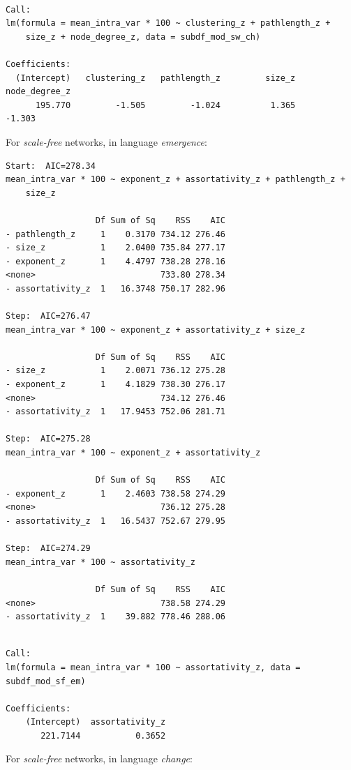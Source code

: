 \documentclass[
]{article}
\begin{document}
\begin{verbatim}

Call:
lm(formula = mean_intra_var * 100 ~ clustering_z + pathlength_z + 
    size_z + node_degree_z, data = subdf_mod_sw_ch)

Coefficients:
  (Intercept)   clustering_z   pathlength_z         size_z  node_degree_z  
      195.770         -1.505         -1.024          1.365         -1.303  
\end{verbatim}

For \emph{scale-free} networks, in language \emph{emergence}:

\begin{verbatim}
Start:  AIC=278.34
mean_intra_var * 100 ~ exponent_z + assortativity_z + pathlength_z + 
    size_z

                  Df Sum of Sq    RSS    AIC
- pathlength_z     1    0.3170 734.12 276.46
- size_z           1    2.0400 735.84 277.17
- exponent_z       1    4.4797 738.28 278.16
<none>                         733.80 278.34
- assortativity_z  1   16.3748 750.17 282.96

Step:  AIC=276.47
mean_intra_var * 100 ~ exponent_z + assortativity_z + size_z

                  Df Sum of Sq    RSS    AIC
- size_z           1    2.0071 736.12 275.28
- exponent_z       1    4.1829 738.30 276.17
<none>                         734.12 276.46
- assortativity_z  1   17.9453 752.06 281.71

Step:  AIC=275.28
mean_intra_var * 100 ~ exponent_z + assortativity_z

                  Df Sum of Sq    RSS    AIC
- exponent_z       1    2.4603 738.58 274.29
<none>                         736.12 275.28
- assortativity_z  1   16.5437 752.67 279.95

Step:  AIC=274.29
mean_intra_var * 100 ~ assortativity_z

                  Df Sum of Sq    RSS    AIC
<none>                         738.58 274.29
- assortativity_z  1    39.882 778.46 288.06
\end{verbatim}

\begin{verbatim}

Call:
lm(formula = mean_intra_var * 100 ~ assortativity_z, data = subdf_mod_sf_em)

Coefficients:
    (Intercept)  assortativity_z  
       221.7144           0.3652  
\end{verbatim}

For \emph{scale-free} networks, in language \emph{change}:
\end{document}

